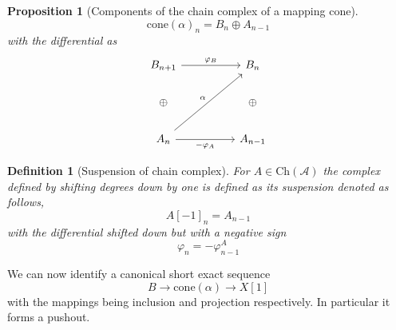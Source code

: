 \documentclass[12pt]{article}
\numberwithin{equation}{section}
\newtheorem{definition}{Definition}[section]
\newtheorem{proposition}{Proposition}[section]
\begin{document}
	
	
	
	\begin{proposition}[Components of the chain complex of a mapping cone]
		\[ \mathrm{cone}(\alpha)_n=B_n\oplus A_{n-1} \]
		with the differential as 
		\[\begin{tikzcd}
			{B_{n+1}} && {B_n} \\
			{\oplus } && { \oplus } \\
			{A_n} && {A_{n-1}}
			\arrow["{\varphi_B}", from=1-1, to=1-3]
			\arrow["\alpha", from=3-1, to=1-3]
			\arrow["{-\varphi_A}"', from=3-1, to=3-3]
		\end{tikzcd}\]
	\end{proposition}
		\begin{definition}[Suspension of chain complex]
		For $A \in \mathrm{Ch}(\mathcal{A})$ the complex defined by shifting degrees down by one is defined as its suspension denoted as follows,
		\[ A[-1]_n=A_{n-1} \] with the differential shifted down but with a negative sign
		\[ \varphi_n = -\varphi^A_{n-1} \]
	\end{definition}
	
	We can now identify a canonical short exact sequence \[ B \to \mathrm{cone}(\alpha) \to X[1] \]
	with the mappings being inclusion and projection respectively. In particular it forms a pushout. 
	
\end{document}
